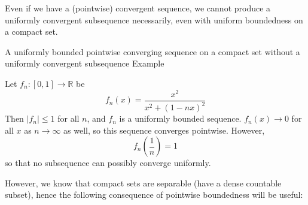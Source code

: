 Even if we have a (pointwise) convergent sequence, we cannot produce a uniformly convergent subsequence necessarily, even with uniform boundedness on a compact set.

\begin{result}
    {A uniformly bounded pointwise converging sequence on a compact set without a uniformly convergent subsequence}
    {Example}

    Let $f_n: [0, 1] \rightarrow \mathbb{R}$ be
    \[f_n(x) = \frac{x^2}{x^2+(1-nx)^2}\]
    Then $|f_n| \leq 1$ for all $n$, and $f_n$ is a uniformly bounded sequence. $f_n(x) \to 0$ for all $x$ as $n \to \infty$ as well, so this sequence converges pointwise.
    However,
    \[f_n\left(\frac{1}{n}\right) = 1\]
    so that no subsequence can possibly converge uniformly.
\end{result}

However, we know that compact sets are separable (have a dense countable subset), hence the following consequence of pointwise boundedness will be useful:

